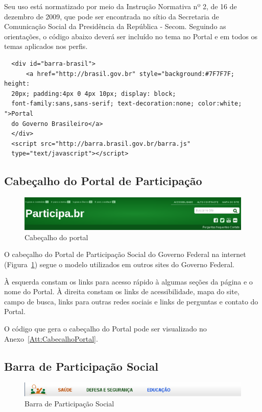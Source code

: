 \documentclass[[a4paper,11pt]{article}
\begin{document}
Seu uso está normatizado por meio da Instrução Normativa nº 2, de 16 de
dezembro de 2009, que pode ser encontrada no sítio da Secretaria de
Comunicação Social da Presidência da República - Secom. Seguindo as
orientações, o código abaixo deverá ser incluído no tema no Portal e em
todos os temas aplicados nos perfis.

{\scriptsize
  \begin{verbatim}
  <div id="barra-brasil">
      <a href="http://brasil.gov.br" style="background:#7F7F7F; height:
  20px; padding:4px 0 4px 10px; display: block;
  font-family:sans,sans-serif; text-decoration:none; color:white; ">Portal
  do Governo Brasileiro</a>
  </div>
  <script src="http://barra.brasil.gov.br/barra.js"
  type="text/javascript"></script>
  \end{verbatim}
}

\subsection{Cabeçalho do Portal de Participação}

\begin{figure}[h]
\center
\includegraphics[scale=0.5]{cabecalho-portal.png}
\caption{Cabeçalho do portal}
\label{fig:cabecalho-portal}
\end{figure}

O cabeçalho do Portal de Participação Social do Governo Federal na internet
(Figura~\ref{fig:cabecalho-portal}) segue o modelo utilizados
em outros sites do Governo Federal.

À esquerda constam os links para acesso rápido à algumas
seções da página e o nome do Portal.
À direita constam os links de acessibilidade, mapa do site, campo de
busca, links para outras redes sociais e links de perguntas e contato do
Portal.

O código que gera o cabeçalho do Portal pode ser visualizado no
Anexo~\ref{Att:CabecalhoPortal}.

\subsection{Barra de Participação Social}

\begin{figure}[h]
\center
\includegraphics[scale=0.5]{barra-participa.png}
\caption{Barra de Participação Social}
\label{fig:barra-participacao}
\end{figure}
\end{document}
